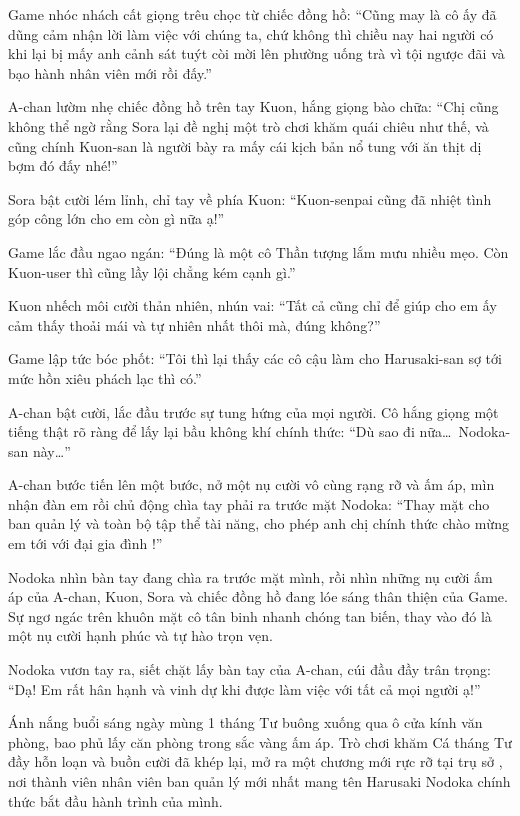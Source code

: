 \documentclass[../main.tex]{subfiles}
\begin{document}
Game nhóc nhách cất giọng trêu chọc từ chiếc đồng hồ: ``Cũng may là cô ấy đã dũng cảm nhận lời làm việc với chúng ta, chứ không thì chiều nay hai người có khi lại bị mấy anh cảnh sát tuýt còi mời lên phường uống trà vì tội ngược đãi và bạo hành nhân viên mới rồi đấy.''

A-chan lườm nhẹ chiếc đồng hồ trên tay Kuon, hắng giọng bào chữa: ``Chị cũng không thể ngờ rằng Sora lại đề nghị một trò chơi khăm quái chiêu như thế, và cũng chính Kuon-san là người bày ra mấy cái kịch bản nổ tung với ăn thịt dị bợm đó đấy nhé!''

Sora bật cười lém lỉnh, chỉ tay về phía Kuon: ``Kuon-senpai cũng đã nhiệt tình góp công lớn cho em còn gì nữa ạ!''

Game lắc đầu ngao ngán: ``Đúng là một cô Thần tượng lắm mưu nhiều mẹo. Còn Kuon-user thì cũng lầy lội chẳng kém cạnh gì.''

Kuon nhếch môi cười thản nhiên, nhún vai: ``Tất cả cũng chỉ để giúp cho em ấy cảm thấy thoải mái và tự nhiên nhất thôi mà, đúng không?''

Game lập tức bóc phốt: ``Tôi thì lại thấy các cô cậu làm cho Harusaki-san sợ tới mức hồn xiêu phách lạc thì có.''

A-chan bật cười, lắc đầu trước sự tung hứng của mọi người. Cô hắng giọng một tiếng thật rõ ràng để lấy lại bầu không khí chính thức: ``Dù sao đi nữa\dots\ Nodoka-san này\dots''

A-chan bước tiến lên một bước, nở một nụ cười vô cùng rạng rỡ và ấm áp, mìn nhận đàn em rồi chủ động chìa tay phải ra trước mặt Nodoka: ``Thay mặt cho ban quản lý và toàn bộ tập thể tài năng, cho phép anh chị chính thức chào mừng em tới với đại gia đình \hll!''

Nodoka nhìn bàn tay đang chìa ra trước mặt mình, rồi nhìn những nụ cười ấm áp của A-chan, Kuon, Sora và chiếc đồng hồ đang lóe sáng thân thiện của Game. Sự ngơ ngác trên khuôn mặt cô tân binh nhanh chóng tan biến, thay vào đó là một nụ cười hạnh phúc và tự hào trọn vẹn.

Nodoka vươn tay ra, siết chặt lấy bàn tay của A-chan, cúi đầu đầy trân trọng: ``Dạ! Em rất hân hạnh và vinh dự khi được làm việc với tất cả mọi người ạ!''

Ánh nắng buổi sáng ngày mùng 1 tháng Tư buông xuống qua ô cửa kính văn phòng, bao phủ lấy căn phòng trong sắc vàng ấm áp. Trò chơi khăm Cá tháng Tư đầy hỗn loạn và buồn cười đã khép lại, mở ra một chương mới rực rỡ tại trụ sở \hll, nơi thành viên nhân viên ban quản lý mới nhất mang tên Harusaki Nodoka chính thức bắt đầu hành trình của mình.
\end{document}
